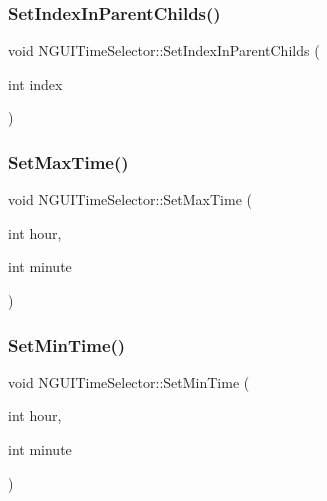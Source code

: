 \hypertarget{class_n_g_u_i_time_selector_a9d245567a6fe3e43941acc4d37bfd21c}{}\label{class_n_g_u_i_time_selector_a9d245567a6fe3e43941acc4d37bfd21c} 
\subsubsection{\texorpdfstring{Set\+Index\+In\+Parent\+Childs()}{SetIndexInParentChilds()}}
{\footnotesize\ttfamily void N\+G\+U\+I\+Time\+Selector\+::\+Set\+Index\+In\+Parent\+Childs (\begin{DoxyParamCaption}\item[{int}]{index }\end{DoxyParamCaption})}

\hypertarget{class_n_g_u_i_time_selector_a324991545a666cda79943bd94cde5c78}{}\label{class_n_g_u_i_time_selector_a324991545a666cda79943bd94cde5c78} 
\subsubsection{\texorpdfstring{Set\+Max\+Time()}{SetMaxTime()}}
{\footnotesize\ttfamily void N\+G\+U\+I\+Time\+Selector\+::\+Set\+Max\+Time (\begin{DoxyParamCaption}\item[{int}]{hour,  }\item[{int}]{minute }\end{DoxyParamCaption})}

\hypertarget{class_n_g_u_i_time_selector_ae5ff5790e5cfa3c5fcbeb96b6d6662fa}{}\label{class_n_g_u_i_time_selector_ae5ff5790e5cfa3c5fcbeb96b6d6662fa} 
\subsubsection{\texorpdfstring{Set\+Min\+Time()}{SetMinTime()}}
{\footnotesize\ttfamily void N\+G\+U\+I\+Time\+Selector\+::\+Set\+Min\+Time (\begin{DoxyParamCaption}\item[{int}]{hour,  }\item[{int}]{minute }\end{DoxyParamCaption})}

